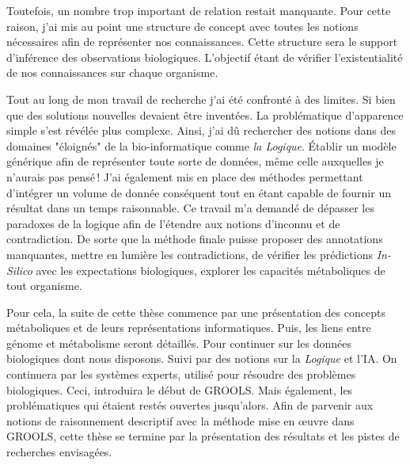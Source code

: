 \begin{refsegment}
Toutefois, un nombre trop important de relation restait manquante. Pour cette raison, j'ai mis au point une structure de concept avec toutes les notions nécessaires afin de représenter nos connaissances. Cette structure sera le support d'inférence des observations biologiques. L'objectif étant de vérifier l'existentialité de nos connaissances sur chaque organisme.

Tout au long de mon travail de recherche j'ai été confronté à des limites. Si bien que des solutions nouvelles devaient être inventées. La problématique d'apparence simple s'est révélée plus complexe. Ainsi, j'ai dû rechercher des notions dans des domaines "éloignés" de la bio-informatique comme \textit{la Logique}. Établir un modèle générique afin de représenter toute sorte de données, même celle auxquelles je n'aurais pas pensé ! J'ai également mis en place des méthodes permettant d'intégrer un volume de donnée conséquent tout en étant capable de fournir un résultat dans un temps raisonnable. Ce travail m'a demandé de dépasser les paradoxes de la logique afin de l'étendre aux notions d'inconnu et de contradiction. De sorte que la méthode finale puisse proposer des annotations manquantes, mettre en lumière les contradictions, de vérifier les prédictions \textit{In-Silico} avec les expectations biologiques, explorer les capacités métaboliques de tout organisme.

Pour cela, la suite de cette thèse commence par une présentation des concepts métaboliques et de leurs représentations informatiques. Puis, les liens entre génome et métabolisme seront détaillés. Pour continuer sur les données biologiques dont nous disposons. Suivi par des notions sur la \textit{Logique} et l'\gls{IA}. On continuera par les systèmes experts, utilisé pour résoudre des problèmes biologiques. Ceci, introduira le début de GROOLS. Mais également, les problématiques qui étaient restés ouvertes jusqu'alors. Afin de parvenir aux notions de raisonnement descriptif avec la méthode mise en œuvre dans GROOLS, cette thèse se termine par la présentation des résultats et les pistes de recherches envisagées.


\subbibliography
\end{refsegment}